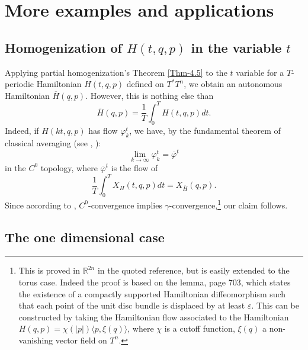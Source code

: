 \documentclass[JEP,XML,SOM,NoFloatCountersInSection,Unicode,published]{cedram}
\numberwithin{equation}{section}
\let \phi \varphi
\theoremstyle{plain}
\theoremstyle{definition}
\theoremstyle{remark}
\begin{document}
\section{More examples and applications}
\subsection{Homogenization of \texorpdfstring{$H(t,q,p)$}{H(t,q,p)} in the variable \texorpdfstring{$t$}{t}}

Applying partial homogenization's Theorem \ref{Thm-4.5} to the $t$ variable for a $T$-periodic Hamiltonian $H(t,q,p)$ defined on $T^*T^n$, we obtain an autonomous Hamiltonian $\overline H(q,p)$. However, this is nothing else than
\[
\overline H(q,p)= \frac{1}{T}\int_{0}^{T}H(t,q,p) dt.
\]
Indeed, if $H(kt, q,p)$ has flow $\phi_{k}^{t}$, we have, by the fundamental theorem of classical averaging (see \cite[p.\,429]{B-M}, \cite[Th.\,3.2.10, p.\,39]{S-V}):
\[
\lim_{k\to \infty} \phi_{k}^{t} = \overline \phi^{t}
\]
in the $C^0$ topology, where $\overline \phi^{t}$ is the flow of
\[
\frac{1}{T} \int_{0}^{T} X_{H}(t,q,p) dt =X_{\overline H}(q,p).
\]
Since according to \cite[Prop.\,4.15,\,p.\,703]{Viterbo-STAGGF}, $C^0$-convergence implies $\gamma$-convergence,\footnote{This is proved in $ {\mathbb R}^{2n}$ in the quoted reference, but is easily extended to the torus case. Indeed the proof is based on the lemma, page 703, which states the existence of a compactly supported Hamiltonian diffeomorphism such that each point of the unit disc bundle is displaced by at least $ \varepsilon $. This can be constructed by taking the Hamiltonian flow associated to the Hamiltonian $H(q,p)=\chi (\vert p \vert) \langle p,\xi(q) \rangle$, where $\chi$ is a cutoff function, $\xi(q)$ a non-vanishing vector field on $T^n$.} our claim follows.

\subsection{The one dimensional case}
\end{document}
